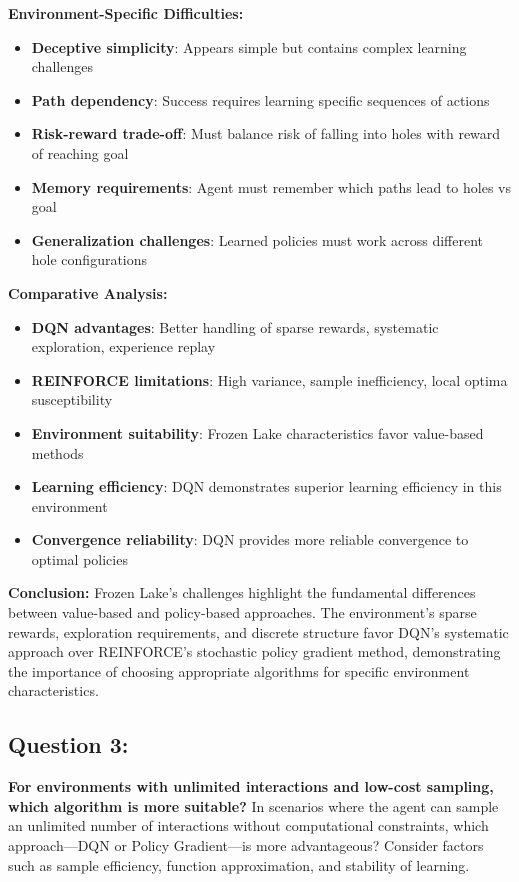 \documentclass[12pt]{article}
\begin{document}
{{{\textbf{Environment-Specific Difficulties:}
\begin{itemize}
    \item \textbf{Deceptive simplicity}: Appears simple but contains complex learning challenges
    \item \textbf{Path dependency}: Success requires learning specific sequences of actions
    \item \textbf{Risk-reward trade-off}: Must balance risk of falling into holes with reward of reaching goal
    \item \textbf{Memory requirements}: Agent must remember which paths lead to holes vs goal
    \item \textbf{Generalization challenges}: Learned policies must work across different hole configurations
\end{itemize}

\textbf{Comparative Analysis:}
\begin{itemize}
    \item \textbf{DQN advantages}: Better handling of sparse rewards, systematic exploration, experience replay
    \item \textbf{REINFORCE limitations}: High variance, sample inefficiency, local optima susceptibility
    \item \textbf{Environment suitability}: Frozen Lake characteristics favor value-based methods
    \item \textbf{Learning efficiency}: DQN demonstrates superior learning efficiency in this environment
    \item \textbf{Convergence reliability}: DQN provides more reliable convergence to optimal policies
\end{itemize}

\textbf{Conclusion:}
Frozen Lake's challenges highlight the fundamental differences between value-based and policy-based approaches. The environment's sparse rewards, exploration requirements, and discrete structure favor DQN's systematic approach over REINFORCE's stochastic policy gradient method, demonstrating the importance of choosing appropriate algorithms for specific environment characteristics.

\subsection{Question 3:}
\textbf{For environments with unlimited interactions and low-cost sampling, which algorithm is more suitable?}
\newline
In scenarios where the agent can sample an unlimited number of interactions without computational constraints, which approach—DQN or Policy Gradient—is more advantageous? Consider factors such as sample efficiency, function approximation, and stability of learning.

}}}
\end{document}

